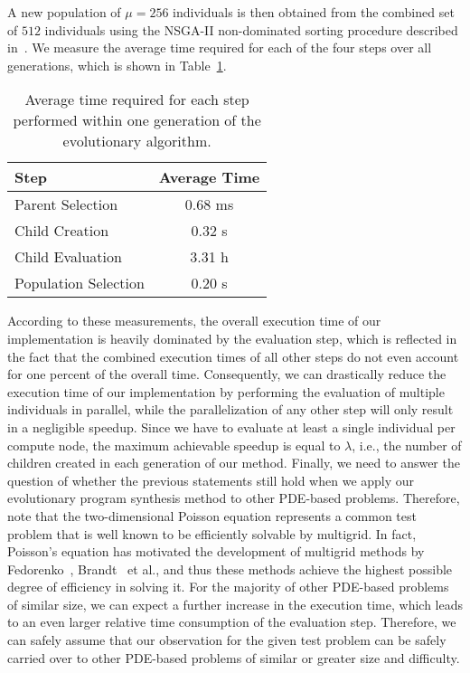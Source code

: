 A new population of $\mu = 256$ individuals is then obtained from the combined set of $512$ individuals using the NSGA-II non-dominated sorting procedure described in~\cite{deb2002fast}.
We measure the average time required for each of the four steps over all generations, which is shown in Table~\ref{table:evolutionary-search-profiling}.
\begin{table}
	\caption{Average time required for each step performed within one generation of the evolutionary algorithm.}
	\label{table:evolutionary-search-profiling}
	\centering
	\begin{tabular}{l c}
		\toprule
		Step & Average Time \\
		\midrule
		Parent Selection & 0.68 ms \\
		\midrule
		Child Creation  & 0.32 s \\
		\midrule
		Child Evaluation  & 3.31 h \\
		\midrule
		Population Selection  & 0.20 s \\
		\bottomrule
	\end{tabular}
\end{table}
According to these measurements, the overall execution time of our implementation is heavily dominated by the evaluation step, which is reflected in the fact that the combined execution times of all other steps do not even account for one percent of the overall time.
Consequently, we can drastically reduce the execution time of our implementation by performing the evaluation of multiple individuals in parallel, while the parallelization of any other step will only result in a negligible speedup. 
Since we have to evaluate at least a single individual per compute node, the maximum achievable speedup is equal to $\lambda$, i.e., the number of children created in each generation of our method.
Finally, we need to answer the question of whether the previous statements still hold when we apply our evolutionary program synthesis method to other PDE-based problems.
Therefore, note that the two-dimensional Poisson equation represents a common test problem that is well known to be efficiently solvable by multigrid.
In fact, Poisson's equation has motivated the development of multigrid methods by Fedorenko~\cite{fedorenko1962relaxation}, Brandt~\cite{brandt1977multi} et al., and thus these methods achieve the highest possible degree of efficiency in solving it.
For the majority of other PDE-based problems of similar size, we can expect a further increase in the execution time, which leads to an even larger relative time consumption of the evaluation step.
Therefore, we can safely assume that our observation for the given test problem can be safely carried over to other PDE-based problems of similar or greater size and difficulty.

